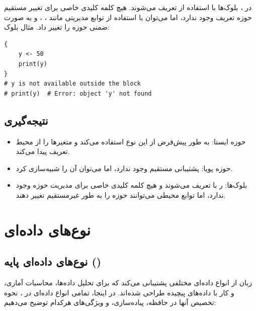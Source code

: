 \documentclass[11pt, a4paper, oneside]{book}
\begin{document}
				در ، بلوک‌ها با استفاده از {} تعریف می‌شوند.
				هیچ کلمه کلیدی خاصی برای تغییر مستقیم حوزه تعریف وجود ندارد، اما می‌توان با استفاده از توابع مدیریتی مانند ، ،  و  به صورت ضمنی حوزه را تغییر داد. مثال بلوک:
				\begin{latin}
					\begin{lstlisting}[caption={\lr{Blocks in R}}] 
{
	y <- 50
	print(y)
}
# y is not available outside the block
# print(y)  # Error: object 'y' not found

					\end{lstlisting}
				\end{latin}
				
			\subsection{نتیجه‌گیری}
			
				\begin{itemize}
					
					\item {\large حوزه ایستا}:
					{\normalsize {} به طور پیش‌فرض از این نوع استفاده می‌کند و متغیرها را از محیط تعریف پیدا می‌کند.}
					
					\item {\large حوزه پویا}:
					{\normalsize پشتیبانی مستقیم وجود ندارد، اما می‌توان آن را شبیه‌سازی کرد.	}
					
					\item {\large بلوک‌ها}:
					{\normalsize ر  با {} تعریف می‌شوند و هیچ کلمه کلیدی خاصی برای مدیریت حوزه وجود ندارد، اما توابع محیطی می‌توانند حوزه را به طور غیرمستقیم تغییر دهند.}
					
				\end{itemize}
			
		\section{نوع‌های داده‌ای}
			
			\subsection{نوع‌های داده‌ای پایه ()}
				
				زبان  از انواع داده‌ای مختلفی پشتیبانی می‌کند که برای تحلیل داده‌ها، محاسبات آماری، و کار با داده‌های پیچیده طراحی شده‌اند. در اینجا، تمامی انواع داده‌ای در ، نحوه تخصیص آنها در حافظه، پیاده‌سازی، و ویژگی‌های هرکدام توضیح می‌دهیم:
			
\end{document}
